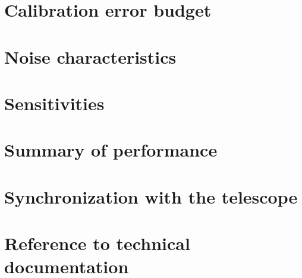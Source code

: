 \documentclass[a4paper, 11pt]{article} %
\begin{document}



\clearpage
\section{Calibration error budget}
\label{se:error}



\clearpage
\section{Noise characteristics}
\label{se:noise}



\clearpage
\section{Sensitivities}
\label{se:nefd}



\clearpage
\section{Summary of performance}
\label{se:summary}


\clearpage
\appendix

  \section{Synchronization with the telescope}
  \label{ap:synchro}
  
  
  \section{Reference to technical documentation}
  \label{ap:doc}
  
\end{document}
